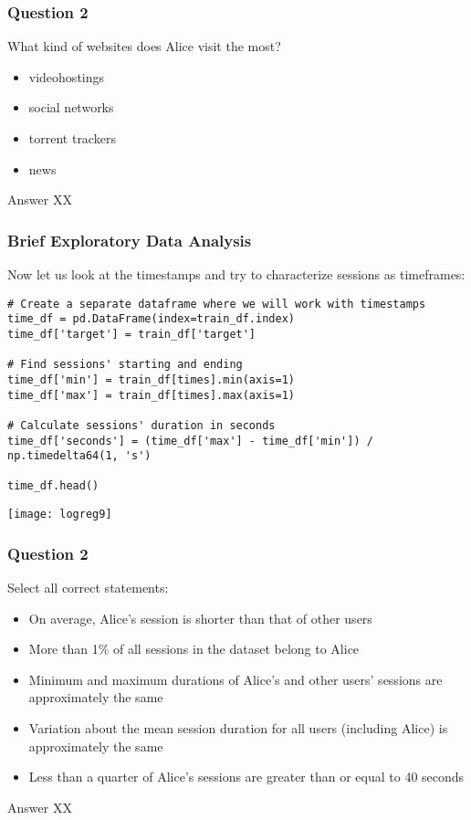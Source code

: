 \begin{frame}[fragile]\frametitle{Question 2}
What kind of websites does Alice visit the most?
\begin{itemize}
\item videohostings
\item social networks
\item torrent trackers
\item news
\end{itemize}
Answer XX
\end{frame}


\begin{frame}[fragile]\frametitle{Brief Exploratory Data Analysis}	
Now let us look at the timestamps and try to characterize sessions as timeframes:
\begin{lstlisting}
# Create a separate dataframe where we will work with timestamps
time_df = pd.DataFrame(index=train_df.index)
time_df['target'] = train_df['target']

# Find sessions' starting and ending
time_df['min'] = train_df[times].min(axis=1)
time_df['max'] = train_df[times].max(axis=1)

# Calculate sessions' duration in seconds
time_df['seconds'] = (time_df['max'] - time_df['min']) / np.timedelta64(1, 's')

time_df.head()
\end{lstlisting}
\begin{center}
\texttt{[image: logreg9]}
\end{center}
\end{frame}

\begin{frame}[fragile]\frametitle{Question 2}
Select all correct statements:
\begin{itemize}
\item On average, Alice's session is shorter than that of other users
\item More than 1\% of all sessions in the dataset belong to Alice
\item Minimum and maximum durations of Alice's and other users' sessions are approximately the same
\item Variation about the mean session duration for all users (including Alice) is approximately the same
\item Less than a quarter of Alice's sessions are greater than or equal to 40 seconds
\end{itemize}
Answer XX
\end{frame}

